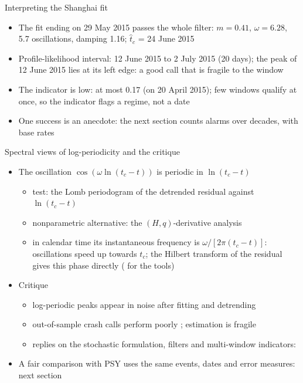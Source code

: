 \begin{frame}{Interpreting the Shanghai fit}
\itemsize{\small}
\begin{itemize}
    \item The fit ending on 29 May 2015 passes the whole filter: $m = 0.41$, $\omega = 6.28$, 5.7 oscillations, damping 1.16; $\hat t_c$ = 24 June 2015
    \item Profile-likelihood interval: 12 June 2015 to 2 July 2015 (20 days); the peak of 12 June 2015 lies at its left edge: a good call that is fragile to the window
    \item The indicator is low: at most 0.17 (on 20 April 2015); few windows qualify at once, so the indicator flags a regime, not a date
    \item One success is an anecdote: the next section counts alarms over decades, with base rates
\end{itemize}
\end{frame}

\begin{frame}{Spectral views of log-periodicity and the critique}
\itemsize{\small}
\begin{itemize}
    \item The oscillation $\cos(\omega\ln(t_c - t))$ is periodic in $\ln(t_c - t)$
    \begin{itemize}
        \item test: the Lomb periodogram of the detrended residual against $\ln(t_c - t)$ 
        \item nonparametric alternative: the $(H, q)$-derivative analysis 
        \item in calendar time its instantaneous frequency is $\omega/[2\pi(t_c - t)]$: oscillations speed up towards $t_c$; the Hilbert transform of the residual gives this phase directly ( for the tools)
    \end{itemize}
    \item Critique
    \begin{itemize}
        \item log-periodic peaks appear in noise after fitting and detrending 
        \item out-of-sample crash calls perform poorly ; estimation is fragile 
        \item replies on the stochastic formulation, filters and multi-window indicators: 
    \end{itemize}
    \item A fair comparison with PSY uses the same events, dates and error measures: next section
\end{itemize}
\end{frame}

